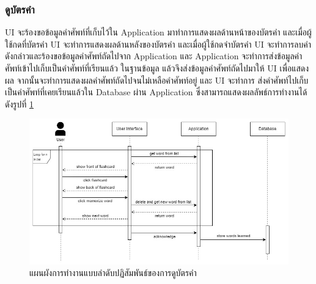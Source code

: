 \documentclass[12pt,oneside,openright,a4paper]{cpe-thai-project}
\begin{document}
\subsubsection{ดูบัตรคำ}
\hspace{1cm}
UI จะร้องขอข้อมูลคำศัพท์ที่เก็บไว้ใน Application มาทำการแสดงผลด้านหน้าของบัตรคำ และเมื่อผู้ใช้กดที่บัตรคำ UI จะทำการแสดงผลด้านหลังของบัตรคำ
และเมื่อผู้ใช้กดจำบัตรคำ UI จะทำการลบคำดังกล่าวและร้องขอข้อมูลคำศัพท์ถัดไปจาก Application และ Application จะทำการส่งข้อมูลคำศัพท์เข้าไปเก็บเป็นคำศัพท์ที่เรียนแล้ว
ในฐานข้อมูล แล้วจึงส่งข้อมูลคำศัพท์ถัดไปมาให้ UI เพื่อแสดงผล จากนั้นจะทำการแสดงผลคำศัพท์ถัดไปจนไม่เหลือคำศัพท์อยู่ และ UI จะทำการ
ส่งคำศัพท์ไปเก็บเป็นคำศัพท์ที่เคยเรียนแล้วใน Database ผ่าน Application ซึ่งสามารถแสดงผลลัพธ์การทำงานได้ดังรูปที่ \ref{fig:S_Flashcard}
\begin{figure}[!h]\centering
	\includegraphics[width=\textwidth, keepaspectratio=true]{image/chap3/sequence/Flashcard.jpg}
	\caption{แผนผังการทำงานแบบลำดับปฏิสัมพันธ์ของการดูบัตรคำ}\label{fig:S_Flashcard}
\end{figure}

\pagebreak
\end{document}
